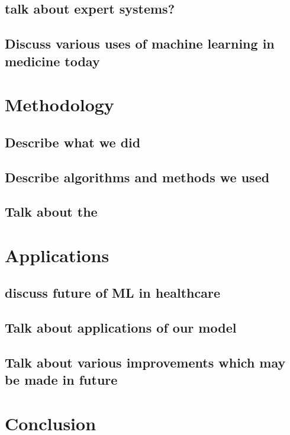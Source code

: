 \documentclass[conference]{IEEEtran}
\begin{document}
\subsection{talk about expert systems?}
\subsection{Discuss various uses of machine learning in medicine today}
\section{Methodology}
\subsection{Describe what we did}
\subsection{Describe algorithms and methods we used}
\subsection{Talk about the }
\section{Applications}
\subsection{discuss future of ML in healthcare}
\subsection{Talk about applications of our model}
\subsection{Talk about various improvements which may be made in future}
\section{Conclusion}

\end{document}
